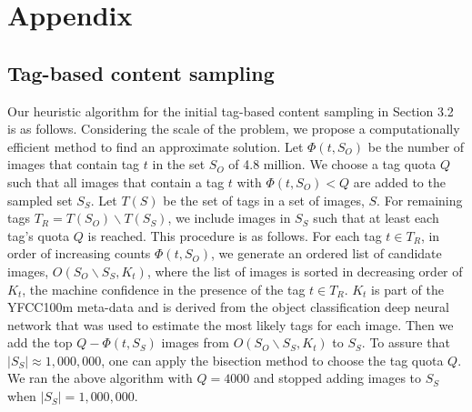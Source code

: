 \documentclass[10pt,journal,compsoc]{IEEEtran}
\begin{document}
\ifCLASSOPTIONcaptionsoff
  \newpage
\fi






\section{Appendix}
\subsection{Tag-based content sampling}

Our heuristic algorithm for the initial tag-based content sampling in Section 3.2 is as follows. Considering the scale of the problem, we propose a computationally efficient method to find an approximate solution. Let $\Phi(t, S_O)$ be the number of images that contain tag $t$ in the set $S_O$ of 4.8 million. We choose a tag quota $Q$ such that all images that contain a tag $t$ with $\Phi(t, S_O) < Q$ are added to the sampled set $S_S$. Let $T(S)$ be the set of tags in a set of images, $S$.  For remaining tags $T_R = T(S_O) \backslash T(S_S)$, we include images in $S_S$ such that at least each tag's quota $Q$ is reached. This procedure is as follows. For each tag $t \in T_R$, in order of increasing counts $\Phi(t, S_O)$, we generate an ordered list of candidate images, $O(S_O \backslash S_S, K_t)$, where the list of images is sorted in decreasing order of  $K_t$, the machine confidence in the presence of the tag $t \in T_R$. $K_t$ is part of the YFCC100m meta-data and is derived from the object classification deep neural network that was used to estimate the most likely tags for each image. Then we add the top $Q - \Phi(t, S_S)$ images from $O(S_O \backslash S_S, K_t)$ to $S_S$. To assure that $|S_S| \approx 1,000,000$, one can apply the bisection method to choose the tag quota $Q$. We ran the above algorithm with $Q = 4000$ and stopped adding images to $S_S$ when $|S_S| = 1,000,000$.
\end{document}
